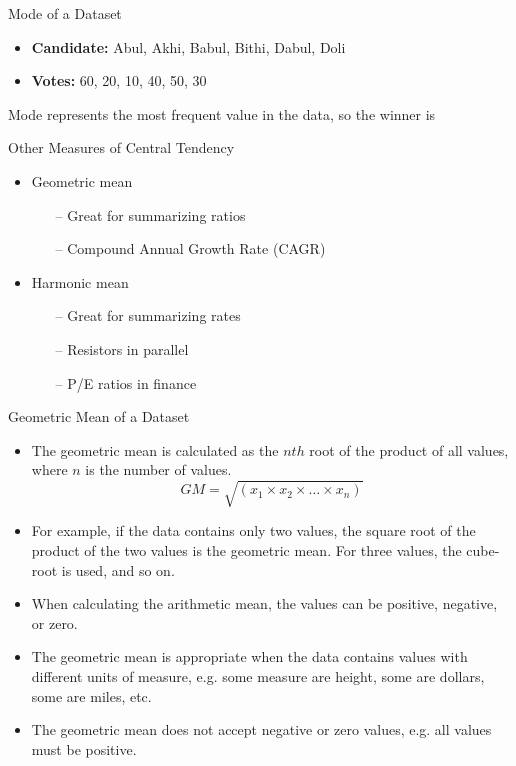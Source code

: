 \documentclass[10pt,dvipsnames, aspectratio=169]{beamer}
\begin{document}
\begin{frame}[t]{Mode of a Dataset}
	\begin{itemize}
		\item \textbf{Candidate:} Abul, Akhi, Babul, Bithi, Dabul, Doli
		\item \textbf{Votes:} 60, 20, 10, 40, 50, 30
	\end{itemize} 
	Mode represents the most frequent value in the data, so the winner is 
	
\end{frame}

\begin{frame}[t]{Other Measures of Central Tendency}
	\begin{itemize}
		\item Geometric mean
		\begin{itemize}
			\item[--] Great for summarizing ratios
			\item[--] Compound Annual Growth Rate
			(CAGR)
		\end{itemize}
	\end{itemize}
	
	\begin{itemize}
		\item Harmonic mean
		\begin{itemize}
			\item[--] Great for summarizing rates
			\item[--] Resistors in parallel
			\item[--] P/E ratios in finance
		\end{itemize}
	\end{itemize}
\end{frame}


\begin{frame}[t]{Geometric Mean of a Dataset}
	\begin{itemize}
		\item The geometric mean is calculated as the $nth$ root of the 
		product 
		of all values, where $n$ is the number of values. 
		$$GM = 
		\sqrt{(x_1\times  x_2 \times … \times x_n)}$$
		
		\item For example, if the data contains only two values, the square 
		root of the product of the two values is the geometric mean. For three 
		values, the cube-root is used, and so on.
		\item When calculating the arithmetic mean, the values can be positive, 
		negative, or zero.
		
		\item The geometric mean is appropriate when the data contains values 
		with different units of measure, e.g. some measure are height, some are 
		dollars, some are miles, etc.
		\item The geometric mean does not accept negative or zero values, e.g. 
		all values must be positive.
	\end{itemize}
\end{frame}
\end{document}
